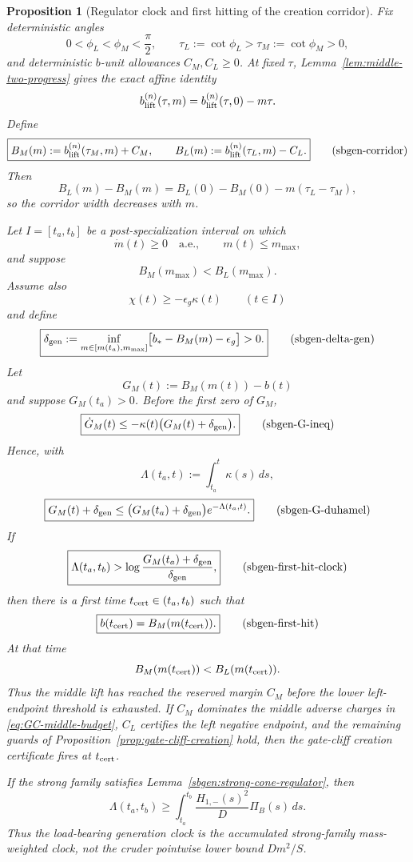 \documentclass{article} %
\theoremstyle{plain}
\newtheorem{proposition}[theorem]{Proposition}
\theoremstyle{definition}
\theoremstyle{remark}
\begin{document}
\begin{proposition}[Regulator clock and first hitting of the creation corridor]
\label{sbgen:first-hit}
Fix deterministic angles
\[
0<\phi_L<\phi_M<\frac\pi2,
\qquad
\tau_L:=\cot\phi_L>\tau_M:=\cot\phi_M>0,
\]
and deterministic $b$-unit allowances $C_M,C_L\ge0$.  At fixed $\tau$,
Lemma~\ref{lem:middle-two-progress} gives the exact affine identity
\[
b_{\rm lift}^{(n)}(\tau,m)
=
b_{\rm lift}^{(n)}(\tau,0)-m\tau.
\]
Define
\[
\boxed{
B_M(m):=b_{\rm lift}^{(n)}(\tau_M,m)+C_M,
\qquad
B_L(m):=b_{\rm lift}^{(n)}(\tau_L,m)-C_L.
}
\tag{sbgen-corridor}\label{sbgen:corridor}
\]
Then
\[
B_L(m)-B_M(m)
=
B_L(0)-B_M(0)-m(\tau_L-\tau_M),
\]
so the corridor width decreases with $m$.

Let $I=[t_a,t_b]$ be a post-specialization interval on which
\[
\dot m(t)\ge0\quad\text{a.e.},
\qquad
m(t)\le m_{\max},
\]
and suppose
\[
\boxed{B_M(m_{\max})<B_L(m_{\max}).}
\tag{sbgen-corridor-positive}\label{sbgen:corridor-positive}
\]
Assume also
\[
\chi(t)\ge-\epsilon_g\kappa(t)
\qquad(t\in I)
\]
and define
\[
\boxed{
\delta_{\rm gen}
:=
\inf_{m\in[m(t_a),m_{\max}]}
\bigl[b_*-B_M(m)-\epsilon_g\bigr]
>0.
}
\tag{sbgen-delta-gen}\label{sbgen:delta-gen}
\]
Let
\[
G_M(t):=B_M(m(t))-b(t)
\]
and suppose $G_M(t_a)>0$.  Before the first zero of $G_M$,
\[
\boxed{
\dot G_M(t)
\le
-\kappa(t)\bigl(G_M(t)+\delta_{\rm gen}\bigr).
}
\tag{sbgen-G-ineq}\label{sbgen:G-ineq}
\]
Hence, with
\[
\Lambda(t_a,t):=\int_{t_a}^t\kappa(s)\,ds,
\]
\[
\boxed{
G_M(t)+\delta_{\rm gen}
\le
\bigl(G_M(t_a)+\delta_{\rm gen}\bigr)e^{-\Lambda(t_a,t)}.
}
\tag{sbgen-G-duhamel}\label{sbgen:G-duhamel}
\]
If
\[
\boxed{
\Lambda(t_a,t_b)
>
\log\frac{G_M(t_a)+\delta_{\rm gen}}{\delta_{\rm gen}},
}
\tag{sbgen-first-hit-clock}\label{sbgen:first-hit-clock}
\]
then there is a first time
$t_{\rm cert}\in(t_a,t_b)$ such that
\[
\boxed{
b(t_{\rm cert})=B_M(m(t_{\rm cert})).}
\tag{sbgen-first-hit}\label{sbgen:first-hit-eq}
\]
At that time
\[
B_M(m(t_{\rm cert}))<B_L(m(t_{\rm cert})).
\]
Thus the middle lift has reached the reserved margin $C_M$ before the lower
left-endpoint threshold is exhausted.  If $C_M$ dominates the middle adverse
charges in \eqref{eq:GC-middle-budget}, $C_L$ certifies the left negative
endpoint, and the remaining guards of
Proposition~\ref{prop:gate-cliff-creation} hold, then the gate-cliff creation
certificate fires at $t_{\rm cert}$.

If the strong family satisfies Lemma~\ref{sbgen:strong-cone-regulator}, then
\[
\boxed{
\Lambda(t_a,t_b)
\ge
\int_{t_a}^{t_b}
\frac{H_{1,-}(s)^2}{D}\Pi_B(s)\,ds.
}
\tag{sbgen-mass-clock}\label{sbgen:mass-clock}
\]
Thus the load-bearing generation clock is the accumulated strong-family
mass-weighted clock, not the cruder pointwise lower bound $Dm^2/S$.
\end{proposition}
\end{document}
